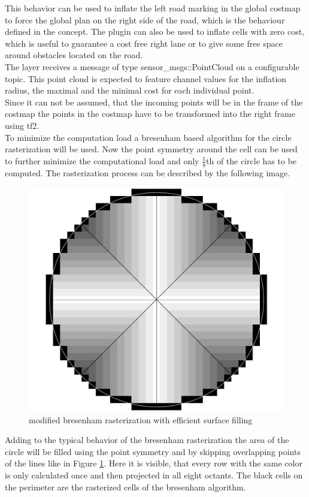 This behavior can be used to inflate the left road marking in the global costmap to force the global plan on the right side of the road, which is the behaviour defined in the concept. The plugin can also be used to inflate cells with zero cost, which is useful to guarantee a cost free right lane or to give some free space around obstacles located on the road.\\

The layer receives a message of type sensor\_msgs::PointCloud on a configurable topic. This point cloud is expected to feature channel values for the inflation radius, the maximal and the minimal cost for each individual point.\\

Since it can not be assumed, that the incoming points will be in the frame of the costmap the points in the costmap have to be transformed into the right frame using tf2.\\

To minimize the computation load a bresenham based algorithm for the circle rasterization will be used\cite{ComputerGraphics}. Now the point symmetry around the cell can be used to further minimize the computational load and only $\frac{1}{8}$th of the circle has to be computed. The rasterization process can be described by the following image.\\

\begin{figure}
	\centering
	\includegraphics[width=.5\textwidth]{Pictures/rasterization}
	\caption{modified bresenham rasterization with efficient surface filling}
	\label{rasterization}
\end{figure}


Adding to the typical behavior of the bresenham rasterization the area of the circle will be filled using the point symmetry and by skipping overlapping points of the lines like in Figure \ref{rasterization}. Here it is visible, that every row with the same color is only calculated once and then projected in all eight octants. The black cells on the perimeter are the rasterized cells of the bresenham algorithm.

